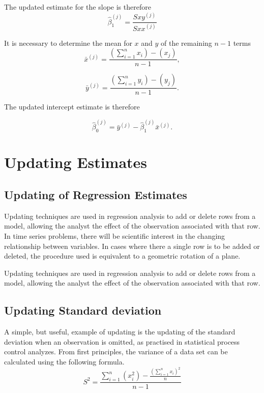 \documentclass[12pt, a4paper]{report}
\theoremstyle{plain}
\theoremstyle{definition}
\theoremstyle{remark}
\begin{document}
The updated estimate for the slope is therefore
\begin{equation}
\hat{\beta}_{1}^{(j)}=\frac{Sxy^{(j)}}{Sxx^{(j)}}
\end{equation}

It is necessary to determine the mean for $x$ and $y$ of the
remaining $n-1$ terms
\begin{equation}
\bar{x}^{(j)}=\frac{(\sum_{i=1}^{n}x_{i})-(x_{j})}{n-1},
\end{equation}

\begin{equation}
\bar{y}^{(j)}=\frac{(\sum_{i=1}^{n}y_{i})-(y_{j})}{n-1}.
\end{equation}

The updated intercept estimate is therefore

\begin{equation}
\hat{\beta}_{0}^{(j)}=\bar{y}^{(j)}-\hat{\beta}_{1}^{(j)}\bar{x}^{(j)}.
\end{equation}

\newpage
\section{Updating Estimates} %

\subsection{Updating of Regression Estimates}
Updating techniques are used in regression analysis to add or delete rows from a model, allowing the analyst the effect of the observation associated with that row. In time series problems, there will be scientific interest in the changing relationship between variables. In cases where there a single row is to be added or deleted, the procedure used is equivalent to a geometric rotation of a plane.

Updating techniques are used in regression analysis to add or delete rows from a model, allowing the analyst the effect of the observation associated with that row.

\subsection{Updating Standard deviation}
A simple, but useful, example of updating is the updating of the standard deviation when an observation is omitted, as practised in statistical process control analyzes. From first principles, the variance of a data set can be calculated using the following formula.
\begin{equation}
S^{2}=\frac{\sum_{i=1}^{n}(x_{i}^{2})-\frac{(\sum_{i=1}^{n}x_{i})^{2}}{n}}{n-1}
\end{equation}
\end{document}
